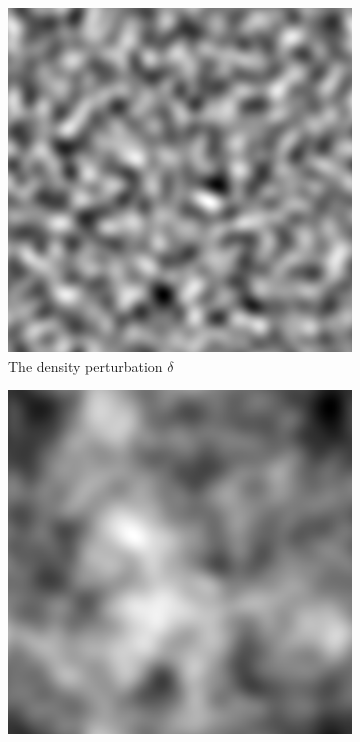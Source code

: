 \documentclass[a4paper, 11pt]{article}
\begin{document}
\begin{figure}
\centering
\begin{subfigure}[b]{0.49\textwidth}
\includegraphics[width=\textwidth]{delta}
\caption{The density perturbation $\delta$}
\label{fig:delta}
\end{subfigure}
\begin{subfigure}[b]{0.49\textwidth}
\includegraphics[width=\textwidth]{Psi}

\end{subfigure}
\end{figure}
\end{document}
